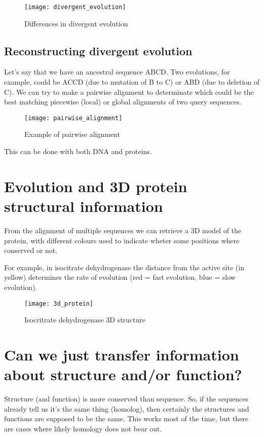 \begin{figure}[!htpb]
\centering
\texttt{[image: divergent\_evolution]}
\caption{Differences in divergent evolution}
\label{Differences in divergent evolution}
\end{figure}

\subsection{Reconstructing divergent evolution}

Let's say that we have an ancestral sequence ABCD. Two evolutions, for example,
could be ACCD (due to mutation of B to C) or ABD (due to deletion of C).
We can try to make a pairwise alignment to determinate which could be the best
matching piecewise (local) or global alignments of two query sequences.

\begin{figure}[!htpb]
\centering
\texttt{[image: pairwise\_alignment]}
\caption{Example of pairwise alignment}
\label{Example of pairwise alignment}
\end{figure}

This can be done with both DNA and proteins.

\section{Evolution and 3D protein structural information}

From the alignment of multiple sequences we can retrieve a 3D model of the protein,
with different colours used to indicate wheter some positions where conserved or not.

For example, in isocitrate dehydrogenase the distance from the active site (in yellow)
determines the rate of evolution (red = fast evolution, blue = slow evolution).

\begin{figure}[!htpb]
\centering
\texttt{[image: 3d\_protein]}
\caption{Isocritrate dehydrogenase 3D structure}
\label{Isocritrate dehydrogenase 3D structure}
\end{figure}

\section{Can we just transfer information about structure and/or function?}

Structure (and function) is more conserved than sequence. So, if the sequences already
tell us it’s the same thing (homolog), then certainly the structures and functions are
supposed to be the same. This works most of the time, but there are cases where likely
homology does not bear out.

